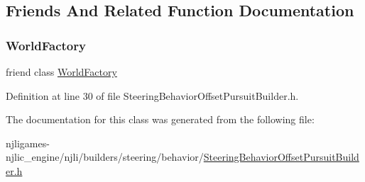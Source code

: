 \subsection{Friends And Related Function Documentation}
\mbox{\label{classnjli_1_1_steering_behavior_offset_pursuit_builder_acb96ebb09abe8f2a37a915a842babfac}} 
\subsubsection{\texorpdfstring{World\+Factory}{WorldFactory}}
{\footnotesize\ttfamily friend class \mbox{\hyperlink{classnjli_1_1_world_factory}{World\+Factory}}\hspace{0.3cm}{\ttfamily [friend]}}



Definition at line 30 of file Steering\+Behavior\+Offset\+Pursuit\+Builder.\+h.



The documentation for this class was generated from the following file\+:\begin{DoxyCompactItemize}
\item 
njligames-\/njlic\+\_\+engine/njli/builders/steering/behavior/\mbox{\hyperlink{_steering_behavior_offset_pursuit_builder_8h}{Steering\+Behavior\+Offset\+Pursuit\+Builder.\+h}}\end{DoxyCompactItemize}
